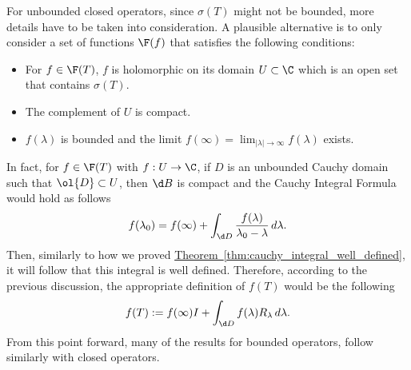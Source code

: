 For unbounded closed operators, since $\sigma(T)$ might not be bounded, more details have to be taken into consideration. A plausible alternative is to only consider a set of functions $\F(f)$ that satisfies the following conditions:
\begin{itemize}
    \item For $f \in \F(T)$, $f$ is holomorphic on its domain $U\subset \C$ which is an open set that contains $\sigma(T)$.
    \item The complement of $U$ is compact.
    \item $f(\lambda)$ is bounded and the limit $f(\infty) = \lim_{|\lambda|\to\infty}f(\lambda)$ exists.
\end{itemize}

In fact, for $f\in \F(T)$ with $f: U \to \C$, if $D$ is an unbounded Cauchy domain such that $\ol{D} \subset U$, then $\d B$ is compact and the Cauchy Integral Formula would hold as follows
\[ f(\lambda_0) = f(\infty) + \int_{\d D}  \frac{f(\lambda)}{\lambda_0-\lambda}\, d\lambda. \]
Then, similarly to how we proved \hyperref[thm:cauchy_integral_well_defined]{Theorem~\ref*{thm:cauchy_integral_well_defined}},  it will follow that this integral is well defined. Therefore, according to the previous discussion, the appropriate definition of $f(T)$ would be the following
\[ f(T) :=  f(\infty) I + \int_{\d D} f(\lambda) R_\lambda\, d\lambda.\]
From this point forward, many of the results for bounded operators, follow similarly with closed operators.


